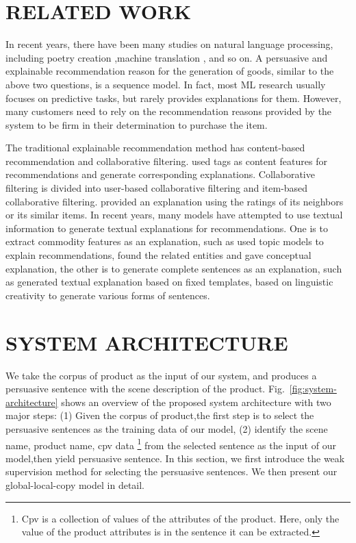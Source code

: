 \documentclass[sigconf]{acmart}
\begin{document}
\section{RELATED WORK}\label{sec:related}
In recent years, there have been many studies on natural language processing, including poetry creation \cite{Colton2012Full,Oliveira2015Tra,Ghazvininejad2016Generating,Yi2017Generating,Zhang2014Chinese,wang2016chinese},machine translation \cite{Kalchbrenner2016Neural,Zhou2016Deep,Wu2016Google}, and so on. A persuasive and explainable recommendation reason for the generation of goods, similar to the above two questions, is a sequence model. In fact, most ML research usually focuses on predictive tasks, but rarely provides explanations for them. However, many customers need to rely on the recommendation reasons provided by the system to be firm in their determination to purchase the item.

The traditional explainable recommendation method has content-based recommendation and collaborative filtering. \cite{vig2009tagsplanations,sigurbjornsson2008flickr} used tags as content features for recommendations and generate corresponding explanations. Collaborative filtering is divided into user-based collaborative filtering and item-based collaborative filtering. \cite{herlocker2000explaining, gedikli2014should,sarwar2001item} provided an explanation using the ratings of its neighbors or its similar items. In recent years, many models have attempted to use textual information to generate textual explanations for recommendations. One is to extract commodity features as an explanation, such as \cite{wu2015flame} used topic models to explain recommendations, \cite{zhang2017entity} found the related entities and gave conceptual explanation, the other is to generate complete sentences as an explanation, such as \cite{ozbal2013brainsup} generated textual explanation based on fixed templates, \cite{munigala2018persuaide} based on linguistic creativity to generate various forms of sentences.


\section{SYSTEM ARCHITECTURE}\label{sec:architecture}
We take the corpus of product as the input of our system, and produces a persuasive sentence with the scene description of the product. Fig.~\ref{fig:system-architecture} shows an overview of the proposed system architecture with two major steps: (1) Given the corpus of product,the first step is to select the persuasive sentences as the training data of our model, (2) identify the scene name, product name, cpv data \footnote{Cpv is a collection of values of the attributes of the product. Here, only the value of the product attributes is in the sentence it can be extracted.} from the selected sentence as the input of our model,then yield persuasive sentence. In this section, we first introduce the weak supervision method for selecting the persuasive sentences. We then present our global-local-copy model in detail.  
\end{document}
